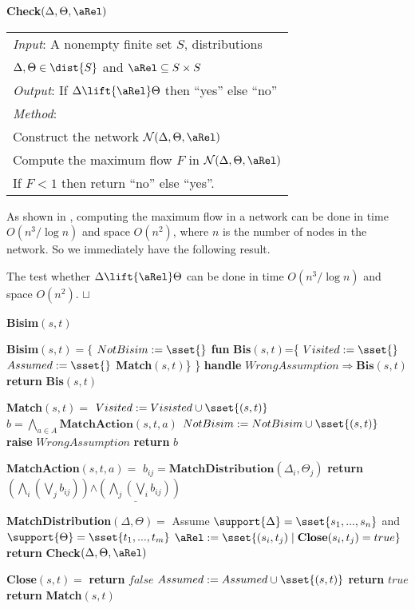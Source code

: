 \documentclass{article}
\def \CN{{\cal N}}
\def\squareforqed{\hbox{\rlap{$\sqcap$}$\sqcup$}}
\def\qed{\ifmmode\squareforqed\else{\unskip\nobreak\hfil
\penalty50\hskip1em\null\nobreak\hfil\squareforqed
\parfillskip=0pt\finalhyphendemerits=0\endgraf}\fi}
\begin{document}
\begin{algorithm}
\caption{\textbf{Check}$(\Delta,\Theta,\aRel)$}
\begin{tabular}{l}
\emph{Input}: A nonempty finite set $S$, distributions\\
\qquad $\Delta,\Theta\in\dist{S}$
and $\aRel\subseteq S\times S$\\
\emph{Output}: If $\Delta\lift{\aRel}\Theta$ then ``yes'' else ``no''\\
\emph{Method}:\\
\qquad Construct the network $\CN(\Delta,\Theta,\aRel)$\\
\qquad Compute the maximum flow $F$ in $\CN(\Delta,\Theta,\aRel)$\\
\qquad If $F<1$ then return ``no'' else ``yes''.
\end{tabular}
\end{algorithm}
As shown in \cite{CHM90}, computing the maximum flow in a network
can be done in time $O(n^3/\log n)$ and space $O(n^2)$, where $n$ is
the number of nodes in the network. So we immediately have the
following result.
\begin{lemma}\label{l:check.lift}
The test whether $\Delta\lift{\aRel}\Theta$ can be done in time $
O(n^3/\log n)$ and space $O(n^2)$. \hfill\qed
\end{lemma}


\begin{algorithm}
\caption{\textbf{Bisim}$(s,t)$}
\parbox[c]{7.8cm}{
\begin{algorithmic}
\STATE \textbf{Bisim}$(s,t)=\{$ \STATE $NotBisim:=\sset{}$ \STATE
\textbf{fun} \textbf{Bis}$(s,t)$=\{ \STATE \qquad $Visited:=\sset{}$
\STATE \qquad $Assumed:=\sset{}$ \STATE \qquad
\textbf{Match}$(s,t)$\} \STATE\} \textbf{handle}
$WrongAssumption\Rightarrow\textbf{Bis}(s,t)$ \STATE \textbf{return}
\textbf{Bis}$(s,t)$

\bigskip
\STATE \textbf{Match}$(s,t)=$ \STATE
$Visited:=Visisted\cup\sset{(s,t)}$ \STATE $b=\bigwedge_{a\in
A}\textbf{MatchAction}(s,t,a)$  \STATE $NotBisim :=
NotBisim\cup\sset{(s,t)}$  \STATE
\textbf{raise} $WrongAssumption$ \ENDIF \ENDIF \STATE
\textbf{return} $b$

\bigskip
\STATE \textbf{MatchAction}$(s,t,a)=$ 
 \STATE
$b_{ij}=\textbf{MatchDistribution}(\Delta_i,\Theta_j)$ \ENDFOR
\ENDFOR \STATE \textbf{return} $(\bigwedge_i(\bigvee_j
b_{ij}))\underline{\wedge(\bigwedge_j(\bigvee_i b_{ij}))}$

\bigskip
\STATE\textbf{MatchDistribution}$(\Delta,\Theta)=$ \STATE Assume
$\support{\Delta}=\sset{s_1,...,s_n}$ and
$\support{\Theta}=\sset{t_1,...,t_m}$ \STATE
$\aRel:=\sset{(s_i,t_j)\mid \textbf{Close}(s_i,t_j)=true}$ \STATE
\textbf{return} \textbf{Check}$(\Delta,\Theta,\aRel)$

\bigskip
\STATE\textbf{Close}$(s,t)=$  \STATE
\textbf{return} $false$  \STATE
$Assumed:=Assumed\cup\sset{(s,t)}$ \STATE \textbf{return} $true$
\ELSE \STATE \textbf{return} \textbf{Match}$(s,t)$ \ENDIF
\end{algorithmic}
}
\end{algorithm}
\end{document}
